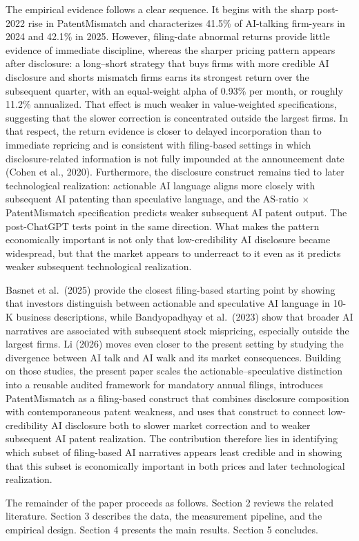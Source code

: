 The empirical evidence follows a clear sequence. It begins with the sharp post-2022 rise in PatentMismatch and characterizes 41.5\% of AI-talking firm-years in 2024 and 42.1\% in 2025. However, filing-date abnormal returns provide little evidence of immediate discipline, whereas the sharper pricing pattern appears after disclosure: a long--short strategy that buys firms with more credible AI disclosure and shorts mismatch firms earns its strongest return over the subsequent quarter, with an equal-weight alpha of 0.93\% per month, or roughly 11.2\% annualized. That effect is much weaker in value-weighted specifications, suggesting that the slower correction is concentrated outside the largest firms. In that respect, the return evidence is closer to delayed incorporation than to immediate repricing and is consistent with filing-based settings in which disclosure-related information is not fully impounded at the announcement date (Cohen et al., 2020). Furthermore, the disclosure construct remains tied to later technological realization: actionable AI language aligns more closely with subsequent AI patenting than speculative language, and the AS-ratio $\times$ PatentMismatch specification predicts weaker subsequent AI patent output. The post-ChatGPT tests point in the same direction. What makes the pattern economically important is not only that low-credibility AI disclosure became widespread, but that the market appears to underreact to it even as it predicts weaker subsequent technological realization.

Basnet et al.~(2025) provide the closest filing-based starting point by showing that investors distinguish between actionable and speculative AI language in 10-K business descriptions, while Bandyopadhyay et al.~(2023) show that broader AI narratives are associated with subsequent stock mispricing, especially outside the largest firms. Li (2026) moves even closer to the present setting by studying the divergence between AI talk and AI walk and its market consequences. Building on those studies, the present paper scales the actionable--speculative distinction into a reusable audited framework for mandatory annual filings, introduces PatentMismatch as a filing-based construct that combines disclosure composition with contemporaneous patent weakness, and uses that construct to connect low-credibility AI disclosure both to slower market correction and to weaker subsequent AI patent realization. The contribution therefore lies in identifying which subset of filing-based AI narratives appears least credible and in showing that this subset is economically important in both prices and later technological realization.

The remainder of the paper proceeds as follows. Section 2 reviews the related literature. Section 3 describes the data, the measurement pipeline, and the empirical design. Section 4 presents the main results. Section 5 concludes.